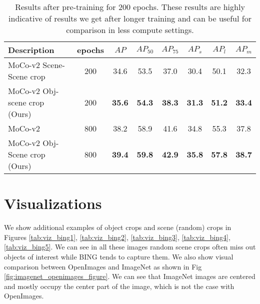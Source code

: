 \begin{table*}
    \centering
    \begin{tabu} to \linewidth {lccccccc} 
        \toprule
         Description & epochs & $AP$ & $AP_{50}$ & $AP_{75}$ & $AP_{s}$ & $AP_{l}$ & $AP_{m}$ \\
         \midrule
    MoCo-v2 Scene-Scene crop  & 200  & 34.6 & 53.5 & 37.0 & 30.4 & 50.1 & 32.3\\
    
    MoCo-v2 Obj-scene crop (Ours)   &200 &  \textbf{35.6} &  \textbf{54.3} & \textbf{38.3} &  \textbf{31.3} & \textbf{51.2}
    &\textbf{33.4}\\
    \midrule
    MoCo-v2 & 800 & 38.2 & 58.9 & 41.6 & 34.8 & 55.3 & 37.8\\
     MoCo-v2 Obj-Scene crop (Ours)& 800  & \textbf{39.4} & \textbf{59.8} & \textbf{42.9} & \textbf{35.8} & \textbf{57.8} & \textbf{38.7}\\
        \bottomrule
    \end{tabu}
    \caption{Results after pre-training for 200 epochs. These results are highly indicative of results we get after longer training and can be useful for comparison in less compute settings.}
    \label{tab:voc_moco_200}
    
\end{table*}



\section{Visualizations}
We show additional examples of object crops and scene (random) crops in Figures \ref{tab:viz_bing1}, \ref{tab:viz_bing2}, \ref{tab:viz_bing3}, \ref{tab:viz_bing4}, \ref{tab:viz_bing5}. We can see in all these images random scene crops often miss out objects of interest while BING tends to capture them. We also show visual comparison between OpenImages and ImageNet as shown in Fig \ref{fig:imagenet_openimages_figure}. We can see that ImageNet images are centered and mostly occupy the center part of the image, which is not the case with OpenImages.


